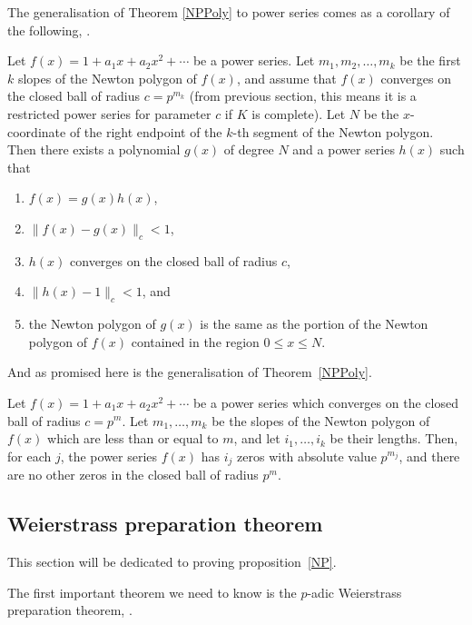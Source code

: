 The generalisation of Theorem \ref{NPPoly} to power series comes as a corollary of the following,
\cite[proposition~7.4.10]{Gouvea}.

\begin{proposition}\label{NP}
    Let $f(x) = 1 + a_1 x + a_2 x^2 + \cdots$ be a power series. Let $m_1,m_2, \dots,m_k$ be the
    first $k$ slopes of the Newton polygon of $f(x)$, and assume that $f(x)$ converges on the
    closed ball of radius $c = p^{m_k}$ (from previous section, this means it is a restricted power
    series for parameter $c$ if $K$ is complete). Let $N$ be the $x$-coordinate of the right
    endpoint of the $k$-th segment of the Newton polygon. Then there exists a polynomial
    $g(x)$ of degree $N$ and a power series $h(x)$ such that
    \begin{enumerate}
        \item $f(x) = g(x) h(x)$,
        \item $\| f(x) - g(x) \|_c < 1$,
        \item $h(x)$ converges on the closed ball of radius $c$,
        \item $\| h(x) - 1\|_c <1$, and
        \item the Newton polygon of $g(x)$ is the same as the portion of the Newton polygon of
        $f(x)$ contained in the region $0 \leq x \leq N$.
    \end{enumerate}
\end{proposition}

And as promised here is the generalisation of Theorem~\ref{NPPoly}.

\begin{cor}
    Let $f(x) = 1 + a_1 x + a_2 x^2 + \cdots$ be a power series which converges on the closed ball
    of radius $c = p^m$. Let $m_1,\dots, m_k$ be the slopes of the Newton polygon of $f(x)$ which
    are less than or equal to $m$, and let $i_1,\dots,i_k$ be their lengths. Then, for each $j$, the
    power series $f(x)$ has $i_j$ zeros with absolute value $p^{m_j}$, and there are no other zeros
    in the closed ball of radius $p^m.$
\end{cor}

\subsection{Weierstrass preparation theorem}

This section will be dedicated to proving proposition~\ref{NP}.

The first important theorem we need to know is the $p$-adic Weierstrass preparation theorem,
\cite[Theorem~7.2.10]{Gouvea}.


